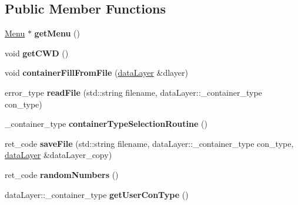 \subsection*{Public Member Functions}
\begin{DoxyCompactItemize}
\item 
\hypertarget{classdata_layer_a91dd3eca2c6d77878fd95d92243096a5}{}\hyperlink{class_menu}{Menu} $\ast$ {\bfseries get\+Menu} ()\label{classdata_layer_a91dd3eca2c6d77878fd95d92243096a5}

\item 
\hypertarget{classdata_layer_a19e22378d3c1df8f490579520326fd0d}{}void {\bfseries get\+C\+W\+D} ()\label{classdata_layer_a19e22378d3c1df8f490579520326fd0d}

\item 
\hypertarget{classdata_layer_aca307b69d5e42fc1df38c852f4cd5b61}{}void {\bfseries container\+Fill\+From\+File} (\hyperlink{classdata_layer}{data\+Layer} \&dlayer)\label{classdata_layer_aca307b69d5e42fc1df38c852f4cd5b61}

\item 
\hypertarget{classdata_layer_a092412284e24eaaae2d46501bf7f5abd}{}error\+\_\+type {\bfseries read\+File} (std\+::string filename, data\+Layer\+::\+\_\+container\+\_\+type con\+\_\+type)\label{classdata_layer_a092412284e24eaaae2d46501bf7f5abd}

\item 
\hypertarget{classdata_layer_addb798c6db32d58ae731f629e8975dd0}{}\+\_\+container\+\_\+type {\bfseries container\+Type\+Selection\+Routine} ()\label{classdata_layer_addb798c6db32d58ae731f629e8975dd0}

\item 
\hypertarget{classdata_layer_a1dec4c9cce96d69ca6682b6feb9db66c}{}ret\+\_\+code {\bfseries save\+File} (std\+::string filename, data\+Layer\+::\+\_\+container\+\_\+type con\+\_\+type, \hyperlink{classdata_layer}{data\+Layer} \&data\+Layer\+\_\+copy)\label{classdata_layer_a1dec4c9cce96d69ca6682b6feb9db66c}

\item 
\hypertarget{classdata_layer_ae1612efd69f0c114892cdbfbe37529e9}{}ret\+\_\+code {\bfseries random\+Numbers} ()\label{classdata_layer_ae1612efd69f0c114892cdbfbe37529e9}

\item 
\hypertarget{classdata_layer_a8a5cd5b8a03186e545f2cfe59ba91634}{}data\+Layer\+::\+\_\+container\+\_\+type {\bfseries get\+User\+Con\+Type} ()\label{classdata_layer_a8a5cd5b8a03186e545f2cfe59ba91634}


\end{DoxyCompactItemize}
